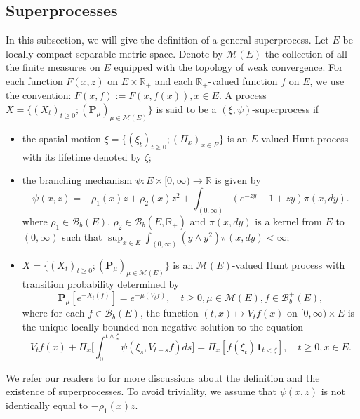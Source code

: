 \documentclass[EJP]{ejpecp} %
\begin{document}
\subsection{Superprocesses}
\label{sec: definition of superprocess}
	In this subsection, we will give the definition of a general superprocess.
	Let $E$ be locally compact separable metric space. Denote by $\mathcal M(E)$ the collection of all the finite measures on $E$ equipped with the topology of weak convergence.
	For each function $F(x,z)$ on $E\times \mathbb R_+$ and each $\mathbb R_+$-valued function $f$ on $E$, we use the  convention: $ F(x,f) := F(x,f(x)), x\in E.$
	A process $X=\{(X_t)_{t\geq 0}; (\mathbf P_\mu)_{\mu \in \mathcal M(E)}\}$ is said to be a $(\xi,\psi)$-superprocess if
\begin{itemize}
\item
  	the spatial motion $\xi=\{(\xi_t)_{t\geq 0};(\Pi_x)_{x\in E}\}$ is an $E$-valued Hunt process with its lifetime denoted by $\zeta$;
\item
  	the branching mechanism $\psi: E\times[0,\infty) \to \mathbb R$ is given by
\begin{equation}
\label{eq: branching mechanism}
  	\psi(x,z)=
  	-\rho_1(x) z + \rho_2 (x) z^2 + \int_{(0,\infty)} (e^{-zy} - 1 + zy) \pi(x,dy).
\end{equation}
	where $\rho_1 \in \mathcal B_b(E)$, $\rho_2 \in \mathcal B_b(E, \mathbb R_+)$ and $\pi(x,dy)$ is a kernel from $E$ to $(0,\infty)$ such that $\sup_{x\in E} \int_{(0,\infty)} (y\wedge y^2) \pi(x,dy) < \infty$;
\item
  	$X=\{(X_t)_{t\geq 0}; (\mathbf P_\mu)_{\mu \in \mathcal M(E)}\}$ is an $\mathcal M(E)$-valued Hunt process with transition probability determined by
\[
    \mathbf P_\mu [e^{-X_t(f)}] 
    = e^{-\mu(V_tf)},
    \quad t\geq 0, \mu \in \mathcal M(E), f\in \mathcal B^+_b(E),
\]
 	where for each $f\in \mathcal B_b(E)$, the function $(t,x)\mapsto V_tf(x)$ on $[0,\infty) \times E$ is the unique locally bounded non-negative solution to the equation
\begin{equation}
\label{eq:FKPP_in_definition}
    V_tf(x) + \Pi_x \Big[  \int_0^{t\wedge \zeta} \psi(\xi_s,V_{t-s}f)ds \Big]
    = \Pi_x [ f(\xi_t)\mathbf 1_{t<\zeta} ],
    \quad t \geq 0, x \in E.
\end{equation}
\end{itemize}
	We refer our readers to \cite{Li2011Measure-valued} for more discussions about the definition and the existence of superprocesses.
	To avoid triviality, we assume that $\psi(x,z)$ is not identically equal to $-\rho_1(x)z$.
\end{document}

